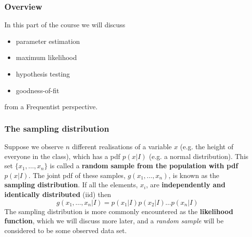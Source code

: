 
\def\mytitle{Part 2: Frequentist statistical building blocks}
\def\mydate{25 March 2015}
\def\myauthor{Matthew Pitkin}
\def\affiliation{University of Glasgow}
\def\latexxslt{beamer}
\def\latexmode{beamer}
\def\theme{m}
\def\event{GraWIToN School}



%


\begin{frame}

\frametitle{Overview}
\label{overview}

In this part of the course we will discuss

\begin{itemize}
\item parameter estimation

\item maximum likelihood

\item hypothesis testing

\item goodness-of-fit

\end{itemize}

from a Frequentist perspective.

\end{frame}

\begin{frame}

\frametitle{The sampling distribution}
\label{thesamplingdistribution}

Suppose we observe $n$ different realisations of a variable $x$ (e.g. the height of everyone in the class),
which has a pdf $p(x|I)$ (e.g. a normal distribution). This set
$\{x_1,\ldots,x_n\}$ is called a \textbf{random sample from the population with pdf} $p(x|I)$.
The joint pdf of these samples, $g(x_1,\ldots,x_n)$, is known as the \textbf{sampling distribution}. If all
the elements, $x_i$, are \textbf{independently and identically distributed} (iid) then
\[
g(x_1,\ldots,x_n|I) = p(x_1|I)p(x_2|I)\ldots p(x_n|I)
\]
The sampling distribution is more commonly encountered as the \textbf{likelihood function}, which we will
discuss more later, and a \emph{random sample} will be considered to be some observed data set.

\end{frame}

